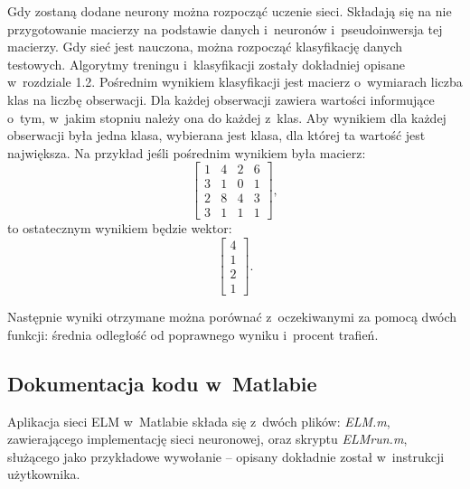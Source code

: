 \documentclass{article}
\begin{document}
Gdy zostaną dodane neurony można rozpocząć uczenie sieci. 
Składają się na nie przygotowanie macierzy na podstawie danych i~neuronów i~pseudoinwersja tej macierzy. 
Gdy sieć jest nauczona, można rozpocząć klasyfikację danych testowych.
Algorytmy treningu i~klasyfikacji zostały dokładniej opisane w~rozdziale 1.2.
Pośrednim wynikiem klasyfikacji jest macierz o~wymiarach liczba klas na liczbę obserwacji.
Dla każdej obserwacji zawiera wartości informujące o~tym, w~jakim stopniu należy ona do każdej z~klas.
Aby wynikiem dla każdej obserwacji była jedna klasa, wybierana jest klasa, dla której ta wartość jest największa.
Na przykład jeśli pośrednim wynikiem była macierz:
\[ \begin{bmatrix} 1&4&2&6 \\ 3&1&0&1 \\ 2&8&4&3 \\ 3&1&1&1 \end{bmatrix},\]
to ostatecznym wynikiem będzie wektor:
\[ \begin{bmatrix} 4 \\ 1 \\ 2 \\ 1 \end{bmatrix}.\]

Następnie wyniki otrzymane można porównać z~oczekiwanymi za pomocą dwóch funkcji: średnia odległość od poprawnego wyniku i~procent trafień.

\subsection{Dokumentacja kodu w~Matlabie}
Aplikacja sieci ELM w~Matlabie składa się z~dwóch plików: \textit{ELM.m}, zawierającego implementację sieci neuronowej, oraz skryptu \textit{ELM\textunderscore run.m}, służącego jako przykładowe wywołanie -- opisany dokładnie został w~instrukcji użytkownika.
\end{document}
